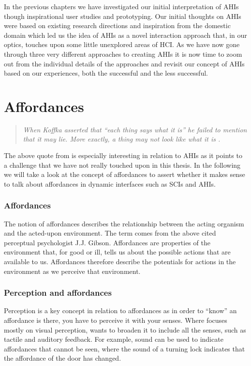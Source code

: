 In the previous chapters we have investigated our initial interpretation of AHIs though inspirational user studies and prototyping.
Our initial thoughts on AHIs were based on existing research directions and inspiration from the domestic domain which led us the idea of AHIs as a novel interaction approach that, in our optics, touches upon some little unexplored areas of HCI.  
As we have now gone through three very different approaches to creating AHIs it is now time to zoom out from the individual details of the approaches and revisit our concept of AHIs based on our experiences, both the successful and the less successful.

\section{Affordances}
\begin{quotation}
\emph{When Koffka asserted that ``each thing says what it is'' he failed to mention that it may lie. More exactly, a thing may not look like what it is \citep{gibson1979ecological}.}
\end{quotation}
The above quote from \citeauthor{gibson1979ecological} is especially interesting in relation to AHIs as it points to a challenge that we have not really touched upon in this thesis.
In the following we will take a look at the concept of affordances to assert whether it makes sense to talk about affordances in dynamic interfaces such as SCIs and AHIs.
\subsubsection{Affordances}
The notion of affordances describes the relationship between the acting organism and the acted-upon environment.
The term comes from the above cited perceptual psychologist J.J. Gibson.
Affordances are properties of the environment that, for good or ill, tells us about the possible actions that are available to us.
Affordances therefore describe the potentials for actions in the environment as we perceive that environment.  

\subsubsection{Perception and affordances}
Perception is a key concept in relation to affordances as in order to ``know'' an affordance is there, you have to perceive it with your senses. Where \citet{gibson1979ecological} focuses mostly on visual perception, \citet{gaver1991technology} wants to broaden it to include all the senses, such as tactile and auditory feedback.
For example, sound can be used to indicate affordances that cannot be seen, where the sound of a turning lock indicates that the affordance of the door has changed.

